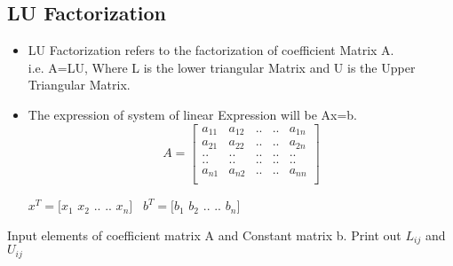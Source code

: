 \documentclass[12pt]{beamer}
\begin{document}


\subsection{LU Factorization}

	

	\begin{frame}
	\begin{itemize}
		\item LU Factorization refers to the factorization of coefficient Matrix A.\\
	    i.e. A=LU, Where L is the lower triangular Matrix and U is the Upper Triangular Matrix.
	  \item The expression of system of linear Expression will be 
	Ax=b.
	\[
	A=
	  \begin{bmatrix}
	    a_{11} & a_{12} & .. & .. & a_{1n}\\
	    a_{21} & a_{22} & .. & .. & a_{2n}\\
	    .. & .. & .. & .. & ..\\
	    .. & .. & .. & .. & ..\\
	    a_{n1} & a_{n2} & .. & .. & a_{nn}\\
	  \end{bmatrix}
	\]
	
	\begin{center}
	$x^T=[x_1$   $x_2$   $..$   $..$   $x_n]$         
	\ $b^T=[b_1$   $b_2$   $..$   $..$   $b_n]$  
	\end{center}
	\end{itemize}
	\end{frame}
	
	
	
	
	
\begin{frame}
\begin{algorithm}[H]
\do Input elements of coefficient matrix A and Constant matrix b.
Print out $L_{ij}$ and $U_{ij}$
\end{algorithm}
\end{frame}
		
\end{document}

